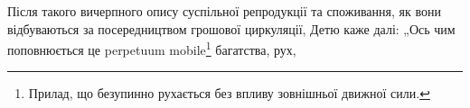 Після такого вичерпного опису суспільної репродукції та споживання, як вони відбуваються за
посередництвом грошової циркуляції, Детю каже далі: „Ось чим поповнюється це perpetuum mobile\footnote*{Прилад, що безупинно рухається без впливу зовнішньої движної сили. }
багатства, рух,
\parbreak{}  %
